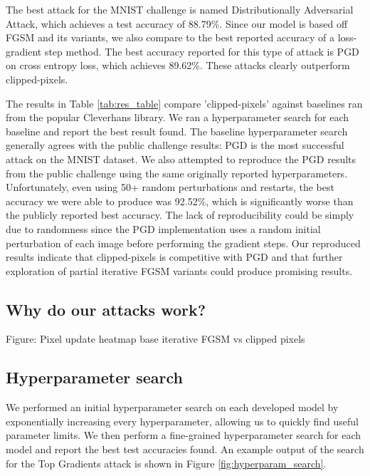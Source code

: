 The best attack for the MNIST challenge is named Distributionally Adversarial Attack, which achieves a test accuracy of 88.79\%. Since our model is based off FGSM and its variants, we also compare to the best reported accuracy of a loss-gradient step method. The best accuracy reported for this type of attack is PGD on cross entropy loss, which achieves 89.62\%. These attacks clearly outperform clipped-pixels.

The results in Table \ref{tab:res_table} compare 'clipped-pixels' against baselines ran from the popular Cleverhans library. We ran a hyperparameter search for each baseline and report the best result found. The baseline hyperparameter search generally agrees with the public challenge results: PGD is the most successful attack on the MNIST dataset. We also attempted to reproduce the PGD results from the public challenge using the same originally reported hyperparameters. Unfortunately, even using 50+ random perturbations and restarts, the best accuracy we were able to produce was 92.52\%, which is significantly worse than the publicly reported best accuracy. The lack of reproducibility could be simply due to randomness since the PGD implementation uses a random initial perturbation of each image before performing the gradient steps. Our reproduced results indicate that clipped-pixels is competitive with PGD and that further exploration of partial iterative FGSM variants could produce promising results.

\subsection{Why do our attacks work?}
Figure: Pixel update heatmap base iterative FGSM vs clipped pixels

\subsection{Hyperparameter search}
We performed an initial hyperparameter search on each developed model by exponentially increasing every hyperparameter, allowing us to quickly find useful parameter limits. We then perform a fine-grained hyperparameter search for each model and report the best test accuracies found. An example output of the search for the Top Gradients attack is shown in Figure \ref{fig:hyperparam_search}.

